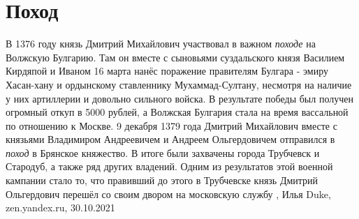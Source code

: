 
 
 
 
 
\chapter{Поход}

В 1376 году князь Дмитрий Михайлович участвовал в важном \emph{походе} на Волжскую
Булгарию. Там он вместе с сыновьями суздальского князя Василием Кирдяпой и
Иваном 16 марта нанёс поражение правителям Булгара - эмиру Хасан-хану и
ордынскому ставленнику Мухаммад-Султану, несмотря на наличие у них артиллерии и
довольно сильного войска. В результате победы был получен огромный откуп в 5000
рублей, а Волжская Булгария стала на время вассальной по отношению к Москве.
9 декабря 1379 года Дмитрий Михайлович вместе с князьями Владимиром Андреевичем
и Андреем Ольгердовичем отправился в \emph{поход} в Брянское княжество. В итоге были
захвачены города Трубчевск и Стародуб, а также ряд других владений. Одним из
результатов этой военной кампании стало то, что правивший до этого в Трубчевске
князь Дмитрий Ольгердович перешёл со своим двором на московскую службу
, Илья Duke, zen.yandex.ru, 30.10.2021
